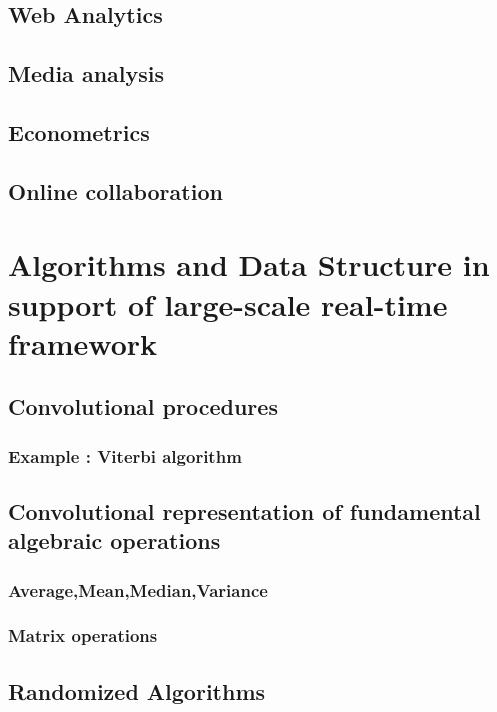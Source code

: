 \documentclass[]{book}    %
\begin{document}
\section{Web Analytics}
\section{Media analysis}
\section{Econometrics}



\section{Online collaboration}

\chapter{Algorithms and Data Structure in support of large-scale real-time framework}
\section{Convolutional procedures}
\subsection{Example : Viterbi algorithm}

\section{Convolutional representation of fundamental algebraic operations}
\subsection{Average,Mean,Median,Variance}
\subsection{Matrix operations}

\section{Randomized Algorithms}
\end{document}
